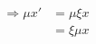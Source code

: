\documentclass[preview]{standalone}
\begin{document}
\begin{align*}
\Rightarrow  \mu x'& =\mu \xi x\\ & = \xi \mu x
\end{align*}
\end{document}
